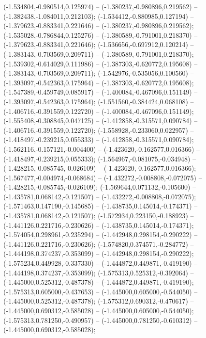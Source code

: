  (-1.534804,-0.980514,0.125974) -- (-1.380237,-0.980896,0.219562) -- (-1.382438,-1.084011,0.212103);
 (-1.534412,-0.880985,0.127194) -- (-1.379623,-0.883341,0.221646) -- (-1.380237,-0.980896,0.219562);
 (-1.535028,-0.786844,0.125276) -- (-1.380589,-0.791001,0.218370) -- (-1.379623,-0.883341,0.221646);
 (-1.536656,-0.697912,0.120214) -- (-1.383143,-0.703569,0.209711) -- (-1.380589,-0.791001,0.218370);
 (-1.539302,-0.614029,0.111986) -- (-1.387303,-0.620772,0.195608) -- (-1.383143,-0.703569,0.209711);
 (-1.542976,-0.535056,0.100560) -- (-1.393097,-0.542363,0.175964) -- (-1.387303,-0.620772,0.195608);
 (-1.547389,-0.459749,0.085917) -- (-1.400084,-0.467096,0.151149) -- (-1.393097,-0.542363,0.175964);
 (-1.551560,-0.384424,0.068108) -- (-1.406716,-0.391559,0.122720) -- (-1.400084,-0.467096,0.151149);
 (-1.555408,-0.308845,0.047125) -- (-1.412858,-0.315571,0.090784) -- (-1.406716,-0.391559,0.122720);
 (-1.558928,-0.233060,0.022957) -- (-1.418497,-0.239215,0.055333) -- (-1.412858,-0.315571,0.090784);
 (-1.562116,-0.157121,-0.004400) -- (-1.423620,-0.162577,0.016366) -- (-1.418497,-0.239215,0.055333);
 (-1.564967,-0.081075,-0.034948) -- (-1.428215,-0.085745,-0.026109) -- (-1.423620,-0.162577,0.016366);
 (-1.567477,-0.004974,-0.068684) -- (-1.432272,-0.008808,-0.072075) -- (-1.428215,-0.085745,-0.026109);
 (-1.569644,0.071132,-0.105600) -- (-1.435781,0.068142,-0.121507) -- (-1.432272,-0.008808,-0.072075);
 (-1.571463,0.147190,-0.145685) -- (-1.438735,0.145014,-0.174371) -- (-1.435781,0.068142,-0.121507);
 (-1.572934,0.223150,-0.188923) -- (-1.441126,0.221716,-0.230626) -- (-1.438735,0.145014,-0.174371);
 (-1.574054,0.298961,-0.235294) -- (-1.442948,0.298154,-0.290222) -- (-1.441126,0.221716,-0.230626);
 (-1.574820,0.374571,-0.284772) -- (-1.444198,0.374237,-0.353099) -- (-1.442948,0.298154,-0.290222);
 (-1.575234,0.449928,-0.337330) -- (-1.444872,0.449871,-0.419190) -- (-1.444198,0.374237,-0.353099);
 (-1.575313,0.525312,-0.392064) -- (-1.445000,0.525312,-0.487378) -- (-1.444872,0.449871,-0.419190);
 (-1.575313,0.605000,-0.437653) -- (-1.445000,0.605000,-0.544050) -- (-1.445000,0.525312,-0.487378);
 (-1.575312,0.690312,-0.470617) -- (-1.445000,0.690312,-0.585028) -- (-1.445000,0.605000,-0.544050);
 (-1.575313,0.781250,-0.490957) -- (-1.445000,0.781250,-0.610312) -- (-1.445000,0.690312,-0.585028);
